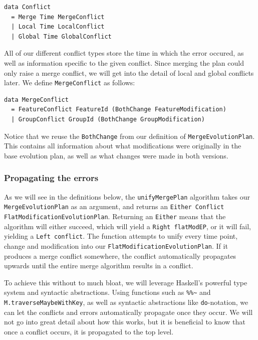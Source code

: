 \documentclass[a4paper,english]{ifimaster}
\begin{document}
\begin{verbatim}
data Conflict
  = Merge Time MergeConflict
  | Local Time LocalConflict
  | Global Time GlobalConflict
\end{verbatim}

All of our different conflict types store the time in which the error occured, as well as information specific to the given conflict. Since merging the plan could only raise a merge conflict, we will get into the detail of local and global conflicts later. We define \texttt{MergeConflict} as follows:

\begin{verbatim}
data MergeConflict
  = FeatureConflict FeatureId (BothChange FeatureModification)
  | GroupConflict GroupId (BothChange GroupModification)
\end{verbatim}

Notice that we reuse the \texttt{BothChange} from our definition of \texttt{Merge\-Evolution\-Plan}. This contains all information about what modifications were originally in the base evolution plan, as well as what changes were made in both versions.

\subsubsection{Propagating the errors}%
\label{ssub:propagating_the_errors}

As we will see in the definitions below, the \texttt{unify\-Merge\-Plan} algorithm takes our \texttt{Merge\-Evolution\-Plan} as an argument, and returns an \texttt{Either Conflict Flat\-Modification\-Evolution\-Plan}. Returning an \texttt{Either} means that the algorithm will either succeed, which will yield a \texttt{Right flatModEP}, or it will fail, yielding a \texttt{Left conflict}. The function attempts to unify every time point, change and modification into our \texttt{Flat\-Modification\-Evolution\-Plan}. If it produces a merge conflict somewhere, the conflict automatically propagates upwards until the entire merge algorithm results in a conflict.

To achieve this without to much bloat, we will leverage Haskell's powerful type system and syntactic abstractions. Using functions such as \texttt{\%\%\~} and \texttt{M.traverseMaybeWithKey}, as well as syntactic abstractions like \texttt{do}-notation, we can let the conflicts and errors automatically propagate once they occur. We will not go into great detail about how this works, but it is beneficial to know that once a conflict occurs, it is propagated to the top level.
\end{document}
